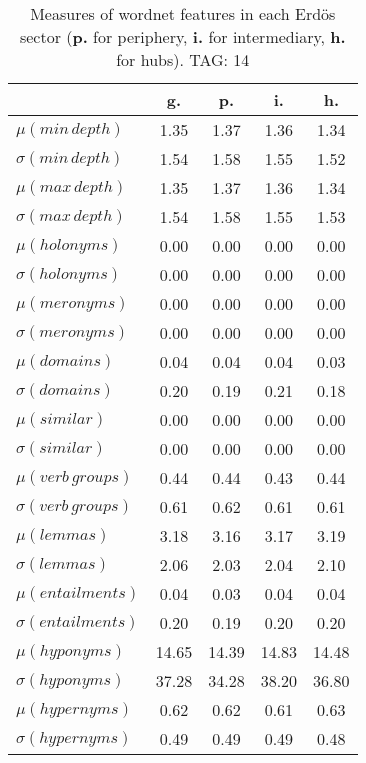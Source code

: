 \begin{table}[h!]
\begin{center}
\begin{tabular}{| l || c | c | c | c |}\hline
 & {\bf g.} & {\bf p.} & {\bf i.} & {\bf h.} \\\hline\hline
$\mu(min\,depth)$ & 1.35  & 1.37  & 1.36  & 1.34 \\
$\sigma(min\,depth)$ & 1.54  & 1.58  & 1.55  & 1.52 \\\hline
$\mu(max\,depth)$ & 1.35  & 1.37  & 1.36  & 1.34 \\
$\sigma(max\,depth)$ & 1.54  & 1.58  & 1.55  & 1.53 \\\hline
$\mu(holonyms)$ & 0.00  & 0.00  & 0.00  & 0.00 \\
$\sigma(holonyms)$ & 0.00  & 0.00  & 0.00  & 0.00 \\\hline
$\mu(meronyms)$ & 0.00  & 0.00  & 0.00  & 0.00 \\
$\sigma(meronyms)$ & 0.00  & 0.00  & 0.00  & 0.00 \\\hline
$\mu(domains)$ & 0.04  & 0.04  & 0.04  & 0.03 \\
$\sigma(domains)$ & 0.20  & 0.19  & 0.21  & 0.18 \\\hline
$\mu(similar)$ & 0.00  & 0.00  & 0.00  & 0.00 \\
$\sigma(similar)$ & 0.00  & 0.00  & 0.00  & 0.00 \\\hline
$\mu(verb\,groups)$ & 0.44  & 0.44  & 0.43  & 0.44 \\
$\sigma(verb\,groups)$ & 0.61  & 0.62  & 0.61  & 0.61 \\\hline
$\mu(lemmas)$ & 3.18  & 3.16  & 3.17  & 3.19 \\
$\sigma(lemmas)$ & 2.06  & 2.03  & 2.04  & 2.10 \\\hline
$\mu(entailments)$ & 0.04  & 0.03  & 0.04  & 0.04 \\
$\sigma(entailments)$ & 0.20  & 0.19  & 0.20  & 0.20 \\\hline
$\mu(hyponyms)$ & 14.65  & 14.39  & 14.83  & 14.48 \\
$\sigma(hyponyms)$ & 37.28  & 34.28  & 38.20  & 36.80 \\\hline
$\mu(hypernyms)$ & 0.62  & 0.62  & 0.61  & 0.63 \\
$\sigma(hypernyms)$ & 0.49  & 0.49  & 0.49  & 0.48 \\\hline
\end{tabular}
\caption{Measures of wordnet features in each Erd\"os sector ({{\bf p.}} for periphery, {{\bf i.}} for intermediary, {{\bf h.}} for hubs). TAG: 14}
\end{center}
\end{table}